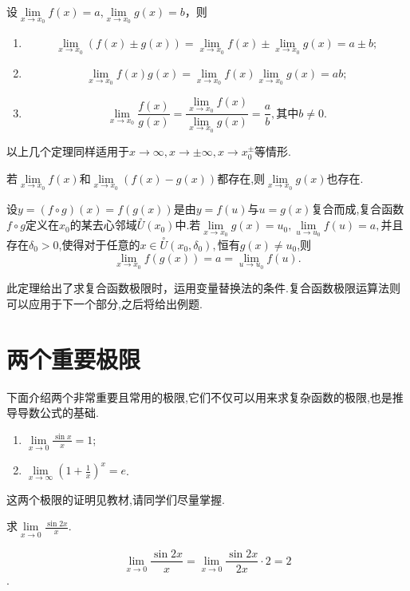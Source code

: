 	\begin{theorem}
		设$\lim\limits_{x\to x_0}f(x)=a$,$\lim\limits_{x\to x_0}g(x)=b$，则
		\begin{enumerate}
			\item 
			\[\lim_{x\to x_0}(f(x)\pm g(x))=\lim_{x\to x_0}f(x) \pm \lim_{x\to x_0}g(x)=a\pm b;
			\]
			\item 
			\[\lim_{x\to x_0}f(x)g(x)=\lim_{x\to x_0}f(x) \lim_{x\to x_0}g(x)=ab;
			\]
			\item 
			\[\lim_{x\to x_0}\frac{f(x)}{g(x)}=\frac{\lim\limits_{x\to x_0}f(x)}{\lim\limits_{x\to x_0}g(x)}=\frac{a}{b},\text{其中}b \ne 0.
			\]
		\end{enumerate}
	\end{theorem}
	以上几个定理同样适用于$x\to \infty,x \to \pm\infty, x\to x_{0}^{\pm}$等情形.
	\begin{example}
		若$\lim\limits_{x\to x_0}f(x)$和$\lim\limits_{x\to x_0}(f(x)-g(x))$都存在,则$\lim\limits_{x\to x_0}g(x)$也存在.
	\end{example}
	
	\begin{theorem}
		设$y=(f\circ g)(x)=f(g(x))$是由$y=f(u)$与$u=g(x)$复合而成,复合函数$f\circ  g$定义在$x_0$的某去心邻域$\overset{\circ}{U}(x_0)$中.若$\lim\limits_{x\to x_0}g(x)=u_0,\lim\limits_{u\to u_0}f(u)=a,$并且存在$\delta _0>0$,使得对于任意的$x\in \overset{\circ}{U}(x_0,\delta_0),$恒有$g(x)\ne u_0$,则
		\[\lim_{x\to x_0}f(g(x))=a=\lim_{u\to u_0}f(u).
		\]
	\end{theorem}	
	此定理给出了求复合函数极限时，运用变量替换法的条件.复合函数极限运算法则可以应用于下一个部分,之后将给出例题.	
		

	\section{两个重要极限}
	下面介绍两个非常重要且常用的极限,它们不仅可以用来求复杂函数的极限,也是推导导数公式的基础.
	\begin{enumerate}
		\item 	$\lim\limits_{x\to 0}\frac{\sin x}{x}=1$;
		\item 	$\lim\limits_{x\to \infty}(1+\frac{1}{x})^x=e$.
	\end{enumerate}
	这两个极限的证明见教材,请同学们尽量掌握.
	
	\begin{example}
		求$\lim\limits_{x\to 0}\frac{\sin2x}{x}.$
	\end{example}
	\begin{solution}
		\[
		\lim\limits_{x\to 0}\frac{\sin2x}{x}=\lim\limits_{x\to 0}\frac{\sin2x}{2x}\cdot 2=2\].
	\end{solution}

